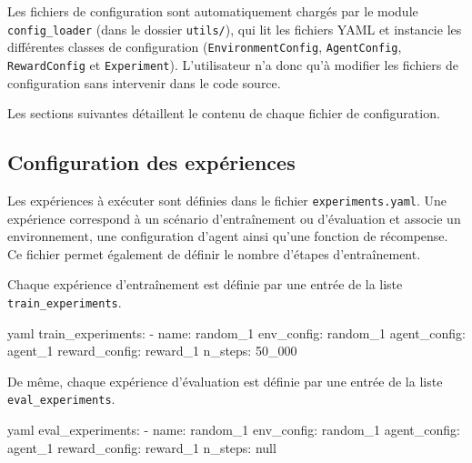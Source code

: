 \begin{tcolorbox}[colback=YellowGreen!5,colframe=YellowGreen,title=Remarque]
    Les fichiers de configuration sont automatiquement chargés par le module \texttt{config\_loader} (dans le dossier \texttt{utils/}), qui lit les fichiers YAML et instancie les différentes classes de configuration (\texttt{EnvironmentConfig}, \texttt{AgentConfig}, \texttt{RewardConfig} et \texttt{Experiment}). L'utilisateur n'a donc qu'à modifier les fichiers de configuration sans intervenir dans le code source.
\end{tcolorbox}

\noindent Les sections suivantes détaillent le contenu de chaque fichier de configuration.

\subsection{Configuration des expériences}

\noindent Les expériences à exécuter sont définies dans le fichier \texttt{experiments.yaml}. Une expérience correspond à un scénario d'entraînement ou d'évaluation et associe un environnement, une configuration d'agent ainsi qu'une fonction de récompense. Ce fichier permet également de définir le nombre d'étapes d'entraînement.

\vspace{10pt}

\noindent Chaque expérience d'entraînement est définie par une entrée de la liste \texttt{train\_experiments}.

\begin{codebox}{yaml}
    train_experiments:
      - name: random_1
        env_config: random_1
        agent_config: agent_1
        reward_config: reward_1
        n_steps: 50_000
\end{codebox}
\vspace{10pt}

\noindent De même, chaque expérience d'évaluation est définie par une entrée de la liste \texttt{eval\_experiments}.

\begin{codebox}{yaml}
    eval_experiments:
      - name: random_1
        env_config: random_1
        agent_config: agent_1
        reward_config: reward_1
        n_steps: null
\end{codebox}

